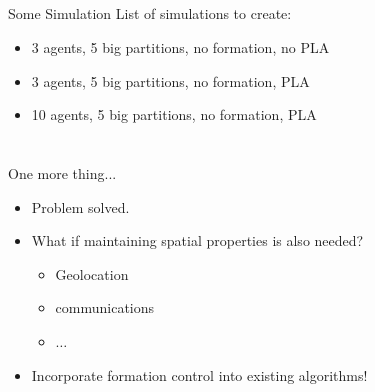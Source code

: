 \documentclass[t]{beamer}
\begin{document}
\subsection[Simulations]{}
\begin{frame}[label=sl3]{Some Simulation}
List of simulations to create:
\begin{itemize}
\item 3 agents, 5 big partitions, no formation, no PLA
\item 3 agents, 5 big partitions, no formation, PLA
\item 10 agents, 5 big partitions, no formation, PLA
\end{itemize}
\end{frame}


\section[Formation Control and PLA]{}
\begin{frame}[label=onemorething]{One more thing...}
\begin{itemize}
\item<1-> Problem solved.
\item<2-> What if maintaining spatial properties is also needed? \begin{itemize}
	\item<2-> Geolocation
	\item<2-> communications
	\item<2-> $\ldots$
\end{itemize}
\item<3-> Incorporate formation control into existing algorithms!
\end{itemize}
\end{frame}

\end{document}

